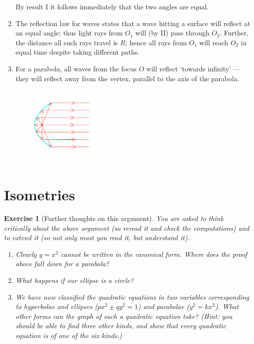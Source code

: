 \documentclass[a4paper,leqno,10pt]{article}
\theoremstyle{exercise}
\newtheorem{Exercise}{Exercise}
\newenvironment{exercise}
  {\begin{mdframed}\begin{Exercise}}
  {\end{Exercise}\end{mdframed}}
\theoremstyle{plain}
\theoremstyle{definition}
\theoremstyle{remark}
\begin{document}
\begin{enumerate}
        By result I it follows immediately that the two angles are equal.
  \item The reflection law for waves states that a wave hitting a surface will reflect at an equal angle; thus light rays from $ O_1 $
        will (by II) pass through $ O_2 $. Further, the distance all such rays travel is $ R $; hence all rays from $ O_1 $ will reach $ O_2 $
        in equal time despite taking different paths.
  \item For a parabola, all waves from the focus $ O $ will reflect `towards infinity' --- they will reflect away from the vertex, parallel to the axis
        of the parabola.
        \begin{center}
          \includegraphics[width=0.4\textwidth]{parabola-reflections}
        \end{center}
\end{enumerate}

\section{Isometries}

\begin{exercise}[Further thoughts on this argument]\label{exercise:degenerate}
  You are asked to think critically about the above argument (so reread it and check the computations) and to extend it (so not only must
  you read it, but understand it).
  \begin{enumerate}
    \item Clearly $ y = x^2 $ cannot be written in the canonical form. Where does the proof above fall down for a parabola?
    \item What happens if our ellipse is a circle?
    \item We have now classified the quadratic equations in two variables corresponding to hyperbolae and ellipses ($ px^2 \pm qy^2 = 1 $)
          and parabolae ($ y^2 = kx^2 $). What other forms can the graph of such a quadratic equation take? (Hint: you should be able to
          find three other kinds, and show that every quadratic equation is of one of the six kinds.)
  \end{enumerate}
\end{exercise}
\end{document}
